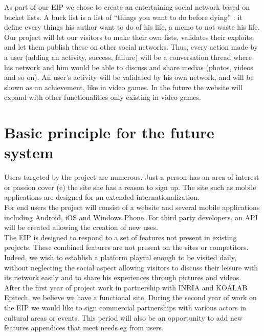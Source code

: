 \documentclass{life-fr}
\begin{document}
As part of our EIP we chose to create an entertaining social network based on bucket lists. A buck list is a list of ``things you want to do before dying'' : it define every things his author want to do of his life, a memo to not waste his life. Our project will let our visitors to make their own lists, validates their exploits, and let them publish these on other social networks. Thus, every action made by a user (adding an activity, success, failure) will be a conversation thread where his network and him would be able to discuss and share medias (photos, videos and so on). An user's activity will be validated by his own network, and will be shown as an achievement, like in video games. In the future the website will expand with other functionalities only existing in video games.

\newpage

\section{Basic principle for the future system}

Users targeted by the project are numerous. Just a person has an area of interest or passion cover (e) the site she has a reason to sign up. The site such as mobile applications are designed for an extended internationalization.\\

For end users the project will consist of a website and several mobile applications including Android, iOS and Windows Phone. For third party developers, an API will be created allowing the creation of new uses.\\

The EIP is designed to respond to a set of features not present in existing projects. These combined features are not present on the sites or competitors. Indeed, we wish to establish a platform playful enough to be visited daily, without neglecting the social aspect allowing visitors to discuss their leisure with its network easily and to share his experiences through pictures and videos.\\

After the first year of project work in partnership with INRIA and KOALAB Epitech, we believe we have a functional site. During the second year of work on the EIP we would like to sign commercial partnerships with various actors in cultural areas or events. This period will also be an opportunity to add new features appendices that meet needs eg from users.
\end{document}
